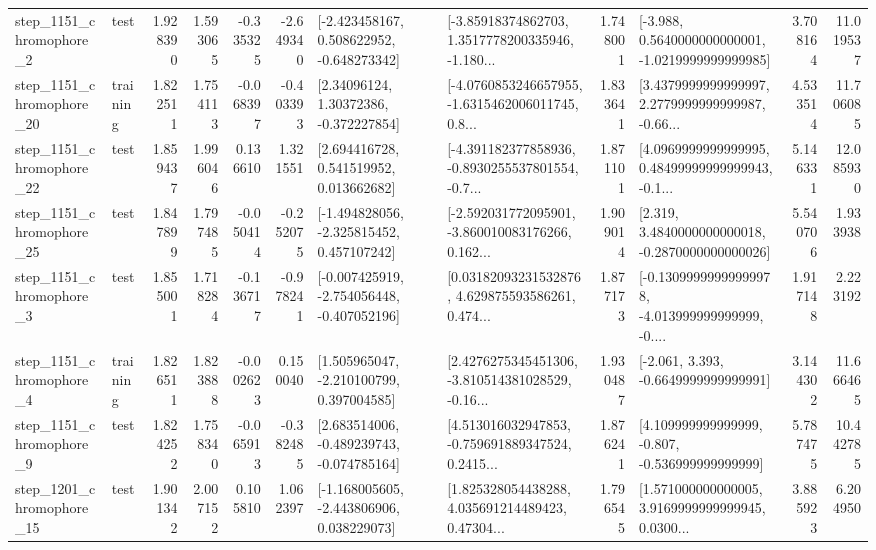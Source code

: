 \begin{tabular}{llrrrrllrlrr}
  step\_1151\_chromophore\_2 &      test &      1.928390 &    1.593065 &     -0.335325 & -2.649340 &   [-2.423458167, 0.508622952, -0.648273342] &  [-3.85918374862703, 1.3517778200335946, -1.180... &       1.748001 &  [-3.988, 0.5640000000000001, -1.0219999999999985] &            3.708164 &         11.019537 \\
 step\_1151\_chromophore\_20 &  training &      1.822511 &    1.754113 &     -0.068397 & -0.403393 &      [2.34096124, 1.30372386, -0.372227854] &  [-4.0760853246657955, -1.6315462006011745, 0.8... &       1.833641 &  [3.4379999999999997, 2.2779999999999987, -0.66... &            4.533514 &         11.706085 \\
 step\_1151\_chromophore\_22 &      test &      1.859437 &    1.996046 &      0.136610 &  1.321551 &     [2.694416728, 0.541519952, 0.013662682] &  [-4.391182377858936, -0.8930255537801554, -0.7... &       1.871101 &  [4.0969999999999995, 0.48499999999999943, -0.1... &            5.146331 &         12.085930 \\
 step\_1151\_chromophore\_25 &      test &      1.847899 &    1.797485 &     -0.050414 & -0.252075 &   [-1.494828056, -2.325815452, 0.457107242] &  [-2.592031772095901, -3.860010083176266, 0.162... &       1.909014 &   [2.319, 3.4840000000000018, -0.2870000000000026] &            5.540706 &          1.933938 \\
  step\_1151\_chromophore\_3 &      test &      1.855001 &    1.718284 &     -0.136717 & -0.978241 &  [-0.007425919, -2.754056448, -0.407052196] &  [0.03182093231532876, 4.629875593586261, 0.474... &       1.877173 &  [-0.13099999999999978, -4.013999999999999, -0.... &            1.917148 &          2.223192 \\
  step\_1151\_chromophore\_4 &  training &      1.826511 &    1.823888 &     -0.002623 &  0.150040 &    [1.505965047, -2.210100799, 0.397004585] &  [2.4276275345451306, -3.810514381028529, -0.16... &       1.930487 &               [-2.061, 3.393, -0.6649999999999991] &            3.144302 &         11.666465 \\
  step\_1151\_chromophore\_9 &      test &      1.824252 &    1.758340 &     -0.065913 & -0.382485 &   [2.683514006, -0.489239743, -0.074785164] &  [4.513016032947853, -0.759691889347524, 0.2415... &       1.876241 &    [4.109999999999999, -0.807, -0.536999999999999] &            5.787475 &         10.442785 \\
 step\_1201\_chromophore\_15 &      test &      1.901342 &    2.007152 &      0.105810 &  1.062397 &   [-1.168005605, -2.443806906, 0.038229073] &  [1.825328054438288, 4.035691214489423, 0.47304... &       1.796545 &  [1.571000000000005, 3.9169999999999945, 0.0300... &            3.885923 &          6.204950 \\

\end{tabular}
